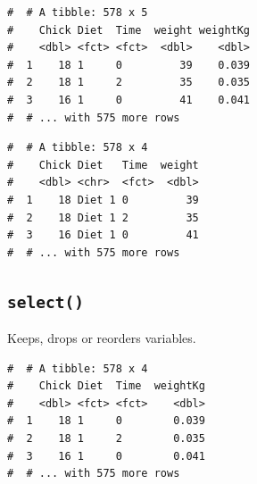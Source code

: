 \documentclass[a4paper,9pt,twocolumn,twoside,printwatermark=false]{pinp}
\begin{document}
\begin{ShadedResult}
\begin{verbatim}
#  # A tibble: 578 x 5
#    Chick Diet  Time  weight weightKg
#    <dbl> <fct> <fct>  <dbl>    <dbl>
#  1    18 1     0         39    0.039
#  2    18 1     2         35    0.035
#  3    16 1     0         41    0.041
#  # ... with 575 more rows
\end{verbatim}
\end{ShadedResult}

\begin{Shaded}
\begin{Highlighting}[]
\StringTok{ } \NormalTok{(}
\end{Highlighting}
\end{Shaded}

\begin{ShadedResult}
\begin{verbatim}
#  # A tibble: 578 x 4
#    Chick Diet   Time  weight
#    <dbl> <chr>  <fct>  <dbl>
#  1    18 Diet 1 0         39
#  2    18 Diet 1 2         35
#  3    16 Diet 1 0         41
#  # ... with 575 more rows
\end{verbatim}
\end{ShadedResult}

\subsection{\texorpdfstring{\texttt{select()}}{select()}}\label{select}

Keeps, drops or reorders variables.

\begin{Shaded}
\begin{Highlighting}[]
\OperatorTok{-}
\end{Highlighting}
\end{Shaded}

\begin{ShadedResult}
\begin{verbatim}
#  # A tibble: 578 x 4
#    Chick Diet  Time  weightKg
#    <dbl> <fct> <fct>    <dbl>
#  1    18 1     0        0.039
#  2    18 1     2        0.035
#  3    16 1     0        0.041
#  # ... with 575 more rows
\end{verbatim}
\end{ShadedResult}
\end{document}
